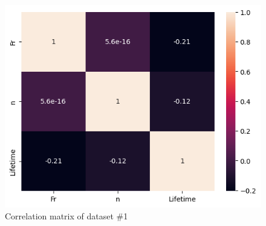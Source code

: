 \documentclass[letterpaper,10pt]{article}
\begin{document}
	\begin{figure}
		\caption{Correlation matrix of dataset \#1}
		\centering
		\includegraphics[scale=0.5]{assets/dataset1_correlation_matrix.png}
	\end{figure}

	\newpage
	 
	
	
\end{document}
